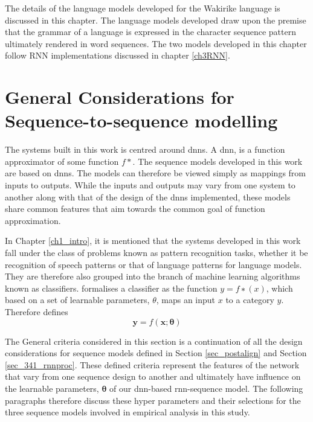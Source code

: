 

The details of the language models developed for the Wakirike language is discussed in this chapter.  The language models developed draw  upon the premise that the grammar of a language is expressed in the character sequence pattern ultimately rendered in word sequences.  The two models developed in this chapter follow RNN implementations discussed in chapter \ref{ch3RNN}.


\section{General Considerations for Sequence-to-sequence modelling}\label{sec_c6_seqdesign}
The systems built in this work is centred around \acrfull{dnns}.  A \acrshort{dnn}, is a function approximator of some function $f\ast$. The sequence models developed in this work are based on \acrshort{dnns}.  The models can therefore be viewed simply as mappings from inputs to outputs.  While the inputs and outputs may vary from one system to another along with that of the design of the \acrshort{dnn}s implemented, these models share common features that aim towards the common goal of function approximation.  

In Chapter \ref{ch1_intro}, it is mentioned that the systems developed in this work fall under the class of problems known as pattern recognition tasks, whether it be recognition of speech patterns or that of language patterns for language models.  They are therefore also grouped into the branch of machine learning algorithms known as classifiers.  \cite{Goodfellow-et-al-2016} formalises a classiﬁer as the function $y=f∗(x)$, which based on a set of learnable parameters, $\theta$, maps an input $x$ to a category $y$. Therefore defines
\begin{equation}\mathbf{y}=f(\mathbf{x;\theta})  \end{equation}\label{eq_c6_classifier}

The General criteria considered in this section is a continuation of all the design considerations for sequence models defined in Section \ref{sec_postalign} and Section \ref{sec_341_rnnproc}.  These defined criteria represent the features of the network that vary from one sequence design to another and ultimately have influence on the learnable parameters, $\mathbf{\theta}$ of our \acrshort{dnn}-based \acrshort{rnn}-sequence model. The following paragraphs therefore discuss these hyper parameters and their selections for the three sequence models involved in empirical analysis in this study.

